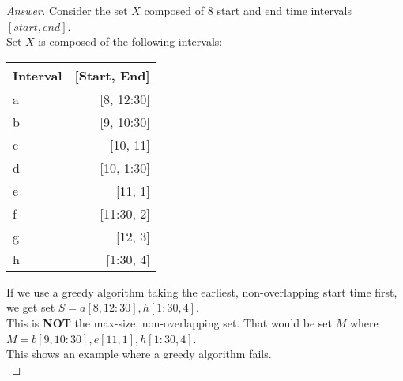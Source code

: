 \documentclass[11pt]{article}
\theoremstyle{definition}
\theoremstyle{definition}
\theoremstyle{definition}
\begin{document}
\begin{proof}[Answer]
    Consider the set $X$ composed of 8 start and end time intervals $[start, end]$. \\
    Set $X$ is composed of the following intervals:\\
    \begin{table}[h!]
    	\begin{center}
    		\label{tab:table1}
    		\begin{tabular}{l|r} %
    			\textbf{Interval} & \textbf{[Start, End]}\\
    			\hline
    			a & [8, 12:30] \\
    			b & [9, 10:30] \\
    			c & [10, 11] \\
    			d & [10, 1:30] \\
    			e & [11, 1]\\
    			f & [11:30, 2] \\
    			g & [12, 3]\\
    			h & [1:30, 4] \\
    		\end{tabular}
    	\end{center}
    \end{table}

If we use a greedy algorithm taking the earliest, non-overlapping start time first, we get set $S = {a[8, 12:30]}, {h[1:30, 4]}$.\\

This is \textbf{NOT} the max-size, non-overlapping set. That would be set $M$ where $M = {b[9, 10:30]}, {e[11, 1]}, {h[1:30, 4]}$.\\ \indent This shows an example where a greedy algorithm fails.\\
\end{proof}


\newpage
\end{document}
